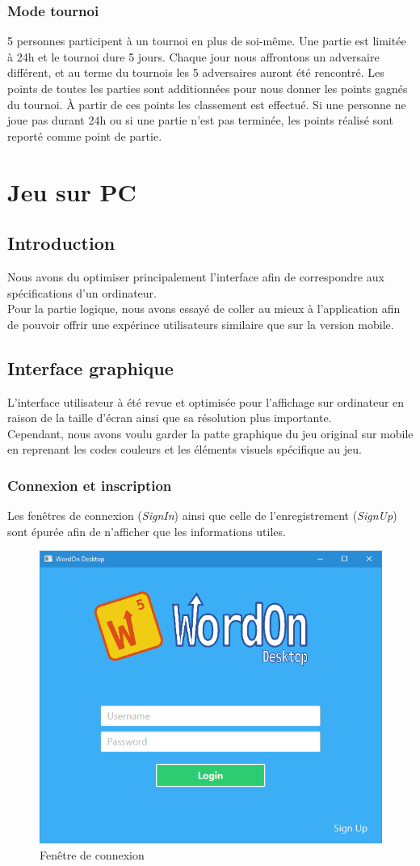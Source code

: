 \documentclass[a4paper,12pt]{article}
\begin{document}
			\subsubsection{Mode tournoi}
			5 personnes participent à un tournoi en plus de soi-même. Une partie est limitée à 24h et le tournoi dure 5 jours. Chaque jour nous affrontons un adversaire différent, et au terme du tournois les 5 adversaires auront été rencontré. Les points de toutes les parties sont additionnées pour nous donner les points gagnés du tournoi. À partir de ces points les classement est effectué.
			Si une personne ne joue pas durant 24h ou si une partie n'est pas terminée, les points réalisé sont reporté comme point de partie.
			
	
	\section{Jeu sur PC}
	\subsection{Introduction}
	Nous avons du optimiser principalement l'interface afin de correspondre aux spécifications d'un ordinateur.\\
	Pour la partie logique, nous avons essayé de coller au mieux à l'application afin de pouvoir offrir une expérince utilisateurs similaire que sur la version mobile. 
	
	\subsection{Interface graphique}
	L'interface utilisateur à été revue et optimisée pour l'affichage sur ordinateur en raison de la taille d'écran ainsi que sa résolution plus importante. \\
	Cependant, nous avons voulu garder la patte graphique du jeu original sur mobile en reprenant les codes couleurs et les éléments visuels spécifique au jeu.
	
		\subsubsection{Connexion et inscription}
		Les fenêtres de connexion (\textit{SignIn}) ainsi que celle de l'enregistrement (\textit{SignUp}) sont épurée afin de n'afficher que les informations utiles.
		
		\begin{figure}[h]
			\centering
			\includegraphics[width=0.4\linewidth]{img/signin.jpg}
			\caption{Fenêtre de connexion}
		\end{figure}
	
\end{document}
